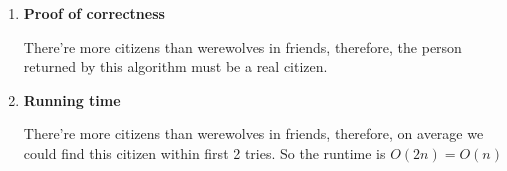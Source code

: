 \documentclass[11pt]{article}
\begin{document}
\begin{enumerate}
\begin{enumerate}
		
		
		\item \textbf{Proof of correctness}
		
		There're more citizens than werewolves in friends, therefore, the person returned by this algorithm must be a real citizen.
		
		\item \textbf{Running time}
		
		There're more citizens than werewolves in friends, therefore, on average we could find this citizen within first 2 tries. So the runtime is $O(2n) = O(n)$ 
		
	\end{enumerate}

	
\end{enumerate}
\end{document}

